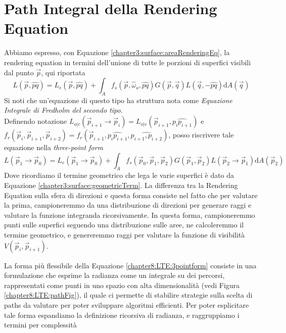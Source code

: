 \section{Path Integral della Rendering Equation}
Abbiamo espresso, con Equazione \ref{chapter3:surface:areaRenderingEq}, la rendering equation in termini dell'unione di tutte le porzioni di 
superfici visibili dal punto $\vec{p}$, qui riportata
\begin{equation*}
	L(\vec{p},\hat{pq}) %
		= L_e(\vec{p},\hat{pq}) + \int_{A}f_s(\vec{p},\hat{\omega}_o,\hat{pq})G(\vec{p},\vec{q})L(\vec{q},-\hat{pq})\mathrm{d}A(\vec{q})
\end{equation*}
Si noti che un'equazione di questo tipo ha struttura nota come \textit{Equazione Integrale di Fredholm del secondo tipo}.\\
Definendo notazione \mbox{$L_{o|e}(\vec{p}_{i+1}\to\vec{p}_i)=L_{o|e}(\vec{p}_{i+1},\widehat{p_ip_{i+1}})$} e \\
\mbox{$f_r(\vec{p}_i,\vec{p}_{i+1},\vec{p}_{i+2})=f_r(\vec{p}_{i+1},\widehat{p_ip_{i+1}},\widehat{p_{i+1},p_{i+2}})$}, 
posso riscrivere tale equazione nella 
\textit{three-point form}
\begin{equation}\label{chapter8:LTE:3pointform}
	L(\vec{p}_1\to\vec{p}_0) %
		= L_e(\vec{p}_1\to\vec{p}_0)+\int_{A}f_s(\vec{p}_0,\vec{p}_1,\vec{p}_2)G(\vec{p}_1,\vec{p}_2)L(\vec{p}_2\to\vec{p}_1)\mathrm{d}A(\vec{p}_2)
\end{equation}
Dove ricordiamo il termine geometrico che lega le varie superfici \`e dato da Equazione \ref{chapter3:surface:geometricTerm}. La differenza tra 
la Rendering Equation sulla sfera di direzioni e questa forma consiste nel fatto che per valutare la prima, campioneremmo da una distribuzione di 
direzioni per generare raggi e valutare la funzione integranda ricorsivamente. In questa forma, campioneremmo punti sulle superfici seguendo una 
distribuzione sulle aree, ne calcoleremmo il termine geometrico, e genereremmo raggi per valutare la funzione di visibilit\`a 
\mbox{$V(\vec{p}_i,\vec{p}_{i+1})$}.\par 
La forma pi\`u flessibile della Equazione \ref{chapter8:LTE:3pointform} consiste in una formulazione che esprime la radianza come un integrale su 
dei percorsi, rappresentati come punti in uno spazio con alta dimensionalit\`a (vedi Figura \ref{chapter8:LTE:pathFig}), il quale ci permette di 
stabilire strategie sulla scelta di paths da valutare per poter sviluppare algoritmi efficienti. Per poter esplicitare tale forma espandiamo la 
definizione ricorsiva di radianza, e raggruppiamo i termini per complessit\`a
